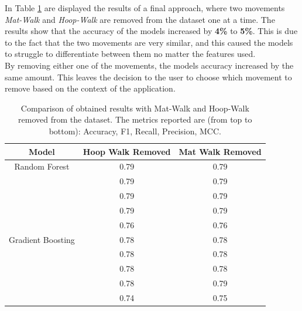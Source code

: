                 In Table \ref{tab:correct_approach_mat_hoop} are displayed the results of a final approach, where two movements \textit{Mat-Walk} and \textit{Hoop-Walk} are removed from the dataset one at a time. The results show that the accuracy of the models increased by \textbf{4\%} to \textbf{5\%}. This is due to the fact that the two movements are very similar, and this caused the models to struggle to differentiate between them no matter the features used. \\
                By removing either one of the movements, the models accuracy increased by the same amount. This leaves the decision to the user to choose which movement to remove based on the context of the application. 

                \begin{table}[htbp]
                    \centering
                    \caption{Comparison of obtained results with Mat-Walk and Hoop-Walk removed from the dataset. The metrics reported are (from top to bottom): Accuracy, F1, Recall, Precision, MCC.}
                    \label{tab:correct_approach_mat_hoop}
                    \begin{tabular}{|c|c|c|}
                    \hline
                    \textbf{Model} & \textbf{Hoop Walk Removed} & \textbf{Mat Walk Removed} \\ \hline
                        Random Forest                   & 0.79 & 0.79 \\ 
                                                        & 0.79 & 0.79 \\ 
                                                        & 0.79 & 0.79 \\ 
                                                        & 0.79 & 0.79 \\
                                                        & 0.76 & 0.76 \\ 
                                                        \hline
                        Gradient Boosting               & 0.78 & 0.78 \\ 
                                                        & 0.78 & 0.78 \\ 
                                                        & 0.78 & 0.78 \\ 
                                                        & 0.78 & 0.79 \\
                                                        & 0.74 & 0.75 \\
                                                        \hline

\end{tabular}
\end{table}
